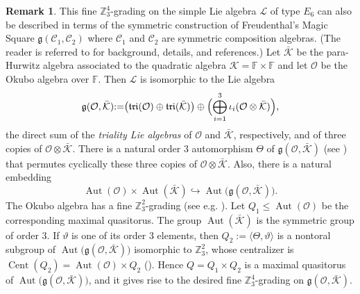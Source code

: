 \documentclass[a4paper,reqno]{amsart}
\theoremstyle{definition}
\newtheorem{remark}[theorem]{Remark}
\numberwithin{theorem}{section}
\numberwithin{equation}{section}
\begin{document}
\begin{remark}\label{re:E6gKO}
This fine ${\mathbb{Z}}_3^4$-grading on the simple Lie algebra ${\mathcal{L}}$ of type $E_6$ can also be described in terms of the symmetric construction of Freudenthal's Magic Square ${{\mathfrak g}}({\mathcal{C}}_1,{\mathcal{C}}_2)$ where ${\mathcal{C}}_1$ and ${\mathcal{C}}_2$ are symmetric composition algebras. (The reader is referred to \cite[\S 6.2]{EK_mon} for background, details, and references.) Let $\bar{\mathcal{K}}$ be the para-Hurwitz algebra associated to the quadratic algebra ${\mathcal{K}}={\mathbb{F}}\times{\mathbb{F}}$ and let ${\mathcal{O}}$ be the Okubo algebra over ${\mathbb{F}}$. Then ${\mathcal{L}}$ is isomorphic to the Lie algebra
\[
{{\mathfrak g}}({\mathcal{O}},\bar{\mathcal{K}}){:=} \bigl({\mathfrak{tri}}({\mathcal{O}})\oplus{\mathfrak{tri}}(\bar{\mathcal{K}})\bigr)\oplus\Bigl(\bigoplus_{i=1}^3\iota_i({\mathcal{O}}\otimes\bar{\mathcal{K}})\Bigr),
\]
the direct sum of the \emph{triality Lie algebras} of ${\mathcal{O}}$ and $\bar{\mathcal{K}}$, respectively, and of three copies of ${\mathcal{O}}\otimes\bar{\mathcal{K}}$. There is a natural order $3$ automorphism $\Theta$ of ${{\mathfrak g}}({\mathcal{O}},\bar{\mathcal{K}})$ (see \cite[Equation (6.23)]{EK_mon}) that permutes cyclically these three copies of ${\mathcal{O}}\otimes\bar{\mathcal{K}}$. Also, there is a natural embedding
\[
\operatorname{\mathrm{Aut}}({\mathcal{O}})\times\operatorname{\mathrm{Aut}}(\bar{\mathcal{K}})\hookrightarrow \operatorname{\mathrm{Aut}}\bigl({{\mathfrak g}}({\mathcal{O}},\bar{\mathcal{K}})\bigr).
\]
The Okubo algebra has a fine ${\mathbb{Z}}_3^2$-grading (see e.g. \cite[\S 4.6]{EK_mon}). Let $Q_1\leq\operatorname{\mathrm{Aut}}({\mathcal{O}})$ be the corresponding maximal quasitorus. The group $\operatorname{\mathrm{Aut}}(\bar{\mathcal{K}})$ is the symmetric group of order $3$. If $\vartheta$ is one of its order $3$ elements, then $Q_2{:=}\langle \Theta,\vartheta\rangle$ is a nontoral subgroup of $\operatorname{\mathrm{Aut}}\bigl({{\mathfrak g}}({\mathcal{O}},\bar{\mathcal{K}})\bigr)$ isomorphic to ${\mathbb{Z}}_3^2$, whose centralizer is 
$\operatorname{\mathrm{Cent}}(Q_2)=\operatorname{\mathrm{Aut}}({\mathcal{O}})\times Q_2$ (\cite[Proposition 6.38 and Corollary 6.39]{EK_mon}). Hence $Q=Q_1\times Q_2$ is a maximal quasitorus of $\operatorname{\mathrm{Aut}}\bigl({{\mathfrak g}}({\mathcal{O}},\bar{\mathcal{K}})\bigr)$, and it gives rise to the desired fine ${\mathbb{Z}}_3^4$-grading on ${{\mathfrak g}}({\mathcal{O}},\bar{\mathcal{K}})$.
\end{remark}
\end{document}
